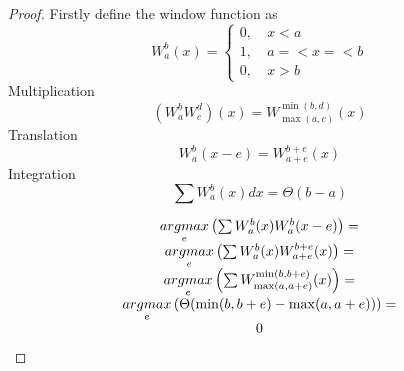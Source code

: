 \begin{proof}
    Firstly define the window function as
    \begin{equation}
        W_a^b(x)=
        \begin{cases}
            0,~& x<a\\
            1,~& a=<x=<b\\
            0,~& x>b
        \end{cases}
    \end{equation}
    Multiplication
    \begin{equation}
        (W_a^bW_c^d)(x)=W_{\max(a,c)}^{\min(b,d)}(x)
    \end{equation}
    Translation
    \begin{equation}
        W_a^b(x-e)=W_{a+e}^{b+e}(x)
    \end{equation}
    Integration
    \begin{equation}
        \label{eq:int_window}
        \sum{W_a^b(x)dx}=\Theta(b-a)
    \end{equation}

    \begin{equation}
        \begin{array}{c}
            
            \underset{e}{argmax}\left(
                \sum
                    {
                        W_a^b(x)W_a^b(x-e)
                    }
                \right)
                =\\
            \underset{e}{argmax}\left(
                    \sum
                        {
                            W_a^b(x)W_
                                {
                                    a+e
                                }
                                ^
                                {
                                    b+e
                                }
                                (x)
                        }
                \right)
                =\\
            \underset{e}{argmax}\left(
                    \sum
                        {
                            W_
                                {
                                    \max(a,a+e)
                                }^
                                {
                                    \min(b,b+e)
                                }
                                (x)
                        }
                 \right)
                =\\
            \underset{e}{argmax}\left(
                    \Theta(\min(b,b+e)-\max(a,a+e))
                 \right)
                =\\
            0
        \end{array}
      \end{equation}


\end{proof}
